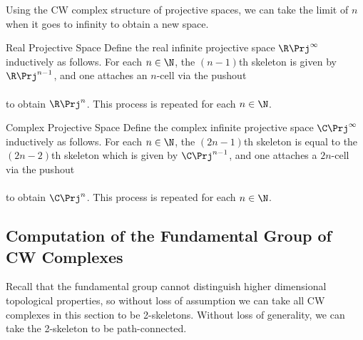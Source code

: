 \documentclass[a4paper]{article}
\begin{document}
Using the CW complex structure of projective spaces, we can take the limit of $n$ when it goes to infinity to obtain a new space. 

\begin{defn}{Real Projective Space}{} Define the real infinite projective space $\R\Prj^\infty$ inductively as follows. For each $n\in\N$, the $(n-1)$th skeleton is given by $\R\Prj^{n-1}$, and one attaches an $n$-cell via the pushout \\
\\
to obtain $\R\Prj^n$. This process is repeated for each $n\in\N$. 
\end{defn}

\begin{defn}{Complex Projective Space}{} Define the complex infinite projective space $\C\Prj^\infty$ inductively as follows. For each $n\in\N$, the $(2n-1)$th skeleton is equal to the $(2n-2)$th skeleton which is given by $\C\Prj^{n-1}$, and one attaches a $2n$-cell via the pushout \\
\\
to obtain $\C\Prj^n$. This process is repeated for each $n\in\N$. 
\end{defn}

\subsection{Computation of the Fundamental Group of CW Complexes}
Recall that the fundamental group cannot distinguish higher dimensional topological properties, so without loss of assumption we can take all CW complexes in this section to be 2-skeletons. Without loss of generality, we can take the 2-skeleton to be path-connected. \\
\end{document}
